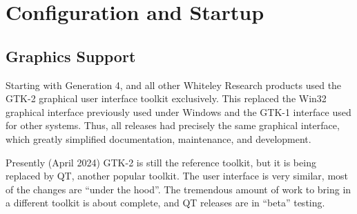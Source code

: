 
\chapter{{\Xic} Configuration and Startup}

\section{Graphics Support}

Starting with Generation 4, {\Xic} and all other Whiteley Research
products used the GTK-2 graphical user interface toolkit exclusively. 
This replaced the Win32 graphical interface previously used under
Windows and the GTK-1 interface used for other systems.  Thus, all
releases had precisely the same graphical interface, which greatly
simplified documentation, maintenance, and development.

Presently (April 2024) GTK-2 is still the reference toolkit, but
it is being replaced by QT, another popular toolkit.  The user
interface is very similar, most of the changes are ``under the
hood''.  The tremendous amount of work to bring in a different
toolkit is about complete, and QT releases are in ``beta'' testing.

